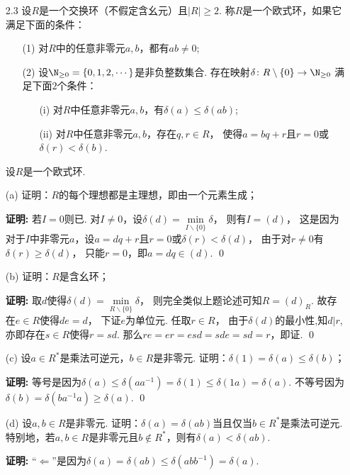 \begin{enumerate}
    \item[2.3] 
        设$R$是一个交换环（不假定含幺元）且$|R| \geq 2$. 
        称$R$是一个欧式环，如果它满足下面的条件：
        \begin{itemize}
            \item[(1)] 对$R$中的任意非零元$a,b$，都有$ab \neq 0$;
            \item[(2)] 设$\N_{\geq 0}=\{0,1,2,\cdots\}$是非负整数集合. 
            存在映射$\delta\colon R\setminus\{0\} \rightarrow \N_{\geq 0}$
            满足下面$2$个条件：
            \begin{itemize}
                \item[(i)] 对$R$中任意非零元$a,b$，有$\delta(a) \leq \delta(ab)$;
                \item[(ii)] 对$R$中任意非零元$a,b$，存在$q,r \in R$，
                使得$a=bq+r$且$r=0$或$\delta(r) <\delta(b)$.
            \end{itemize}
        \end{itemize}
        设$R$是一个欧式环.
    \item[(a)] 证明：$R$的每个理想都是主理想，即由一个元素生成；
    \item[\textbf{证明:}] 
        若$I=0$则已. 对$I\neq0$，设$\delta(d)=\min\limits_{I\backslash \{0\}} \delta$，
        则有$I = (d)$，
        这是因为对于$I$中非零元$a$，设$a=dq+r$且$r=0$或$\delta(r) <\delta(d)$，
        由于对$r\neq0$有$\delta(r)\geq \delta(d)$，
        只能$r=0$，即$a=dq\in(d)$. \qed
    \item[(b)] 证明：$R$是含幺环；
    \item[\textbf{证明:}]   
        取$d$使得$\delta(d)=\min\limits_{R\backslash\{0\}}\delta$，
        则完全类似上题论述可知$R=(d)_R$. 故存在$e \in R$使得$de=d$，
        下证$e$为单位元. 任取$r \in R$，
        由于$\delta(d)$的最小性,知$d|r$,亦即存在$s \in R$使得$r=sd$. 
        那么$re = er = esd = sde =sd =r$，即证. \qed
    \item[(c)] 设$a \in R^*$是乘法可逆元，$b \in R$是非零元. 
        证明：$\delta(1)=\delta(a) \leq \delta(b)$；
    \item[\textbf{证明:}]   
        等号是因为$\delta(a) \leq \delta(aa^{-1}) = \delta(1) \leq \delta(1a) =\delta(a)$. 
        不等号因为$\delta(b) = \delta(ba^{-1}a) \geq \delta(a)$. \qed
    \item[(d)] 设$a,b \in R$是非零元. 证明：$\delta(a) = \delta(ab)$当且仅当$b\in R^*$是乘法可逆元. 
        特别地，若$a,b \in R$是非零元且$b\notin R^*$，则有$\delta(a) < \delta(ab)$.
    \item[\textbf{证明:}]  
        “$\Leftarrow$”是因为$\delta(a) = \delta(ab) \leq \delta(abb^{-1}) =\delta(a)$. 


\end{enumerate}
